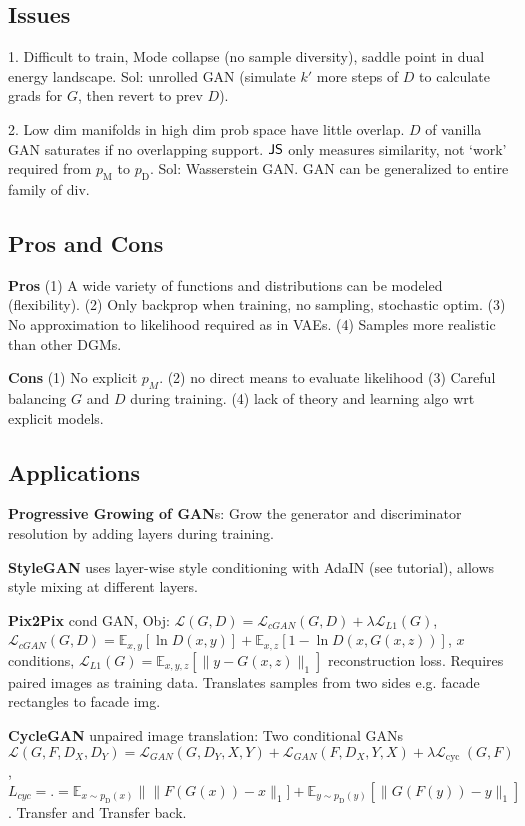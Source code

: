 \subsection*{Issues}

1. Difficult to train, Mode collapse (no sample diversity), saddle point in dual energy landscape. Sol: unrolled GAN (simulate $k'$ more steps of $D$ to calculate grads for $G$, then revert to prev $D$).

2. Low dim manifolds in high dim prob space have little overlap. \(D\) of vanilla GAN saturates if no overlapping support. \(\operatorname{\mathsf{JS}}\) only measures similarity, not `work' required from \(p_{\text {M}}\) to  \(p_{\text {D}}\). Sol: Wasserstein GAN. GAN can be generalized to entire family of div.

\subsection*{Pros and Cons}
\textbf{Pros} (1) A wide variety of functions and distributions can be modeled (flexibility). (2) Only backprop when training, no sampling, stochastic optim. (3)  No approximation to likelihood required as in VAEs. (4) Samples more realistic than other DGMs.

\textbf{Cons} (1) No explicit \(p_{M}\). (2) no direct means to evaluate likelihood (3) Careful balancing \(G\) and \(D\) during training. (4) lack of theory and learning algo wrt explicit models.

\subsection*{Applications}

\textbf{Progressive Growing of GAN}s:  Grow the generator and discriminator resolution by adding layers during training.

\textbf{StyleGAN} uses layer-wise style conditioning with AdaIN (see tutorial), allows style mixing at different layers.

\textbf{Pix2Pix} cond GAN, Obj: \(\mathcal{L}(G, D)=\mathcal{L}_{c G A N}(G, D)+\lambda \mathcal{L}_{L 1}(G)\), \(\mathcal{L}_{{cGAN}}(G, D)=\mathbb{E}_{x, y}[\ln D(x, y)]+\mathbb{E}_{x, z}[1-\ln D(x, G(x, z))]\), \(x\) conditions, \(\mathcal{L}_{L 1}(G)=\mathbb{E}_{x, y, z}[\|y-G(x, z)\|_{1}]\) reconstruction loss. Requires paired images as training data. Translates samples from two sides e.g. facade rectangles to facade img.

\textbf{CycleGAN} unpaired image translation: Two conditional GANs \(\mathcal{L}(G, F, D_{X}, D_{Y})=\mathcal{L}_{G A N}(G, D_{Y}, X, Y)+\mathcal{L}_{G A N}(F, D_{X}, Y, X)+\lambda \mathcal{L}_{\text {cyc }}(G, F)\), \(L_{cyc} = .=\mathbb{E}_{x \sim p_{\text {D}}(x)}\|\| F(G(x))-x \|_{1}]+\mathbb{E}_{y \sim p_{\text {D}}(y)}[\|G(F(y))-y\|_{1}]\). Transfer and Transfer back.

